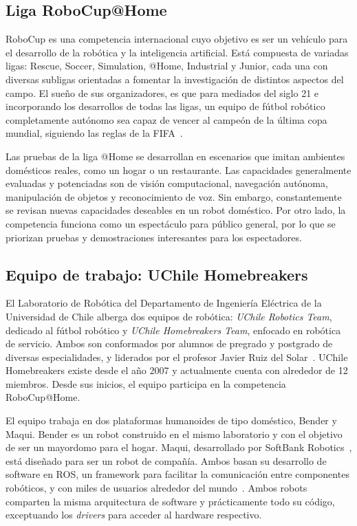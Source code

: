 \subsection{Liga RoboCup@Home}

RoboCup es una competencia internacional cuyo objetivo es ser un vehículo para el desarrollo de la robótica y la inteligencia artificial. Está compuesta de variadas ligas: Rescue, Soccer, Simulation, @Home, Industrial y Junior, cada una con diversas subligas orientadas a fomentar la investigación de distintos aspectos del campo. El sueño de sus organizadores, es que para mediados del siglo 21 e incorporando los desarrollos de todas las ligas, un equipo de fútbol robótico completamente autónomo sea capaz de vencer al campeón de la última copa mundial, siguiendo las reglas de la FIFA~\cite{robocup:rulebook_2018}.

Las pruebas de la liga @Home se desarrollan en escenarios que imitan ambientes domésticos reales, como un hogar o un restaurante. Las capacidades generalmente evaluadas y potenciadas son de visión computacional, navegación autónoma, manipulación de objetos y reconocimiento de voz. Sin embargo, constantemente se revisan nuevas capacidades deseables en un robot doméstico. Por otro lado, la competencia funciona como un espectáculo para público general, por lo que se priorizan pruebas y demostraciones interesantes para los espectadores.

\subsection{Equipo de trabajo: UChile Homebreakers}

El Laboratorio de Robótica del Departamento de Ingeniería Eléctrica de la Universidad de Chile alberga dos equipos de robótica: \textit{UChile Robotics Team}, dedicado al fútbol robótico y \textit{UChile Homebreakers Team}, enfocado en robótica de servicio. Ambos son conformados por alumnos de pregrado y postgrado de diversas especialidades, y liderados por el profesor Javier Ruiz del Solar~\cite{uchile-robotics}. UChile Homebreakers existe desde el año 2007 y actualmente cuenta con alrededor de 12 miembros. Desde sus inicios, el equipo participa en la competencia RoboCup@Home.

El equipo trabaja en dos plataformas humanoides de tipo doméstico, Bender y Maqui. Bender es un robot construido en el mismo laboratorio y con el objetivo de ser un mayordomo para el hogar. Maqui, desarrollado por SoftBank Robotics~\cite{softbank}, está diseñado para ser un robot de compañía. Ambos basan su desarrollo de software en ROS, un framework para facilitar la comunicación entre componentes robóticos, y con miles de usuarios alrededor del mundo~\cite{ROS:2009}. Ambos robots comparten la misma arquitectura de software y prácticamente todo su código, exceptuando los \textit{drivers} para acceder al hardware respectivo. 


